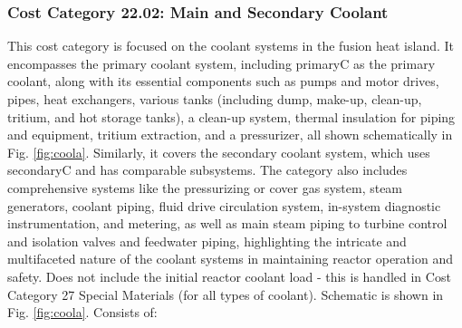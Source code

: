 \subsubsection{Cost Category 22.02: Main and Secondary Coolant} 

This cost category is focused on the coolant systems in the fusion heat island. It encompasses the primary coolant system, including primaryC as the primary coolant, along with its essential components such as pumps and motor drives, pipes, heat exchangers, various tanks (including dump, make-up, clean-up, tritium, and hot storage tanks), a clean-up system, thermal insulation for piping and equipment, tritium extraction, and a pressurizer, all shown schematically in Fig. \ref{fig:coola}. Similarly, it covers the secondary coolant system, which uses secondaryC and has comparable subsystems.  The category also includes comprehensive systems like the pressurizing or cover gas system, steam generators, coolant piping, fluid drive circulation system, in-system diagnostic instrumentation, and metering, as well as main steam piping to turbine control and isolation valves and feedwater piping, highlighting the intricate and multifaceted nature of the coolant systems in maintaining reactor operation and safety.  Does not include the initial reactor coolant load - this is handled in  Cost Category 27 Special Materials (for all types of coolant). Schematic is shown in Fig. \ref{fig:coola}. Consists of:

